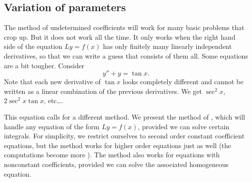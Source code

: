 \documentclass[12pt]{book}
\begin{document}
\subsection{Variation of parameters}

The method of undetermined coefficients will work for many basic
problems that crop up.  But it does not work all the time.  It only works
when the right hand side of the equation $Ly = f(x)$ has only finitely many
linearly independent derivatives, so that we can write a guess that consists
of them all.  Some equations are a bit tougher.  Consider
\begin{equation*}
y''+y = \tan x .
\end{equation*}
Note that each new derivative of $\tan x$ looks completely different and
cannot be written as a linear combination of the previous derivatives.
We get $\sec^2 x$, $2\sec^2 x \tan x$, etc\ldots.

This equation calls for a different method.  We present the method of
\emph{}, which will handle any equation of
the form $Ly = f(x)$,
provided we can solve certain integrals.  For simplicity, we restrict
ourselves to second order constant coefficient equations,
but the method works for higher
order equations just as well (the computations become more
). %
The method also works for equations with nonconstant coefficients,
provided we can solve the associated homogeneous equation.
\end{document}
